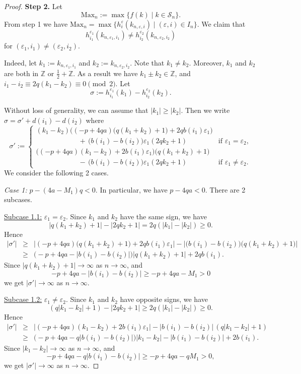 \documentclass[11pt]{amsart}
\numberwithin{equation}{section}
\theoremstyle{plain}
\theoremstyle{definition}
\def\BZ{\mathbb Z}
\def\CS{\mathcal S}
\def\ve{\varepsilon}
\begin{document}
\begin{proof}
\textbf{Step 2.} Let 
$$\text{Max}_n := \max \{f(k) \mid k \in \CS_n\}.$$
From step 1 we have $\text{Max}_n =  \max \{ h_{i}^{\ve}(k_{n, \ve, i}) \mid (\ve, i) \in I_n \}.$ We claim that $$h_{i_1}^{\ve_1}(k_{n,\ve_1,i_1}) \not= h_{i_2}^{\ve_2}(k_{n,\ve_2,i_2})$$
for $(\ve_1,i_1) \not= (\ve_2,i_2)$. 

Indeed, let $k_1:=k_{n,\ve_1,i_1}$ and $k_2:=k_{n,\ve_2,i_2}$. Note that $k_1 \not= k_2$. Moreover, $k_1$ and $k_2$ are both in  $\BZ$ or $\frac{1}{2} + \BZ$. As a result we have $k_1 \pm  k_2 \in \BZ$, and $i_1 - i_2 \equiv 2q (k_1 - k_2) \equiv 0 \pmod{2}$. Let
$$\sigma := h_{i_1}^{\ve_1}(k_1) - h_{i_2}^{\ve_2}(k_2).$$

Without loss of generality, we can assume that $|k_1| \ge |k_2|$. Then we write $\sigma = \sigma' + d(i_1) - d(i_2)$ where
$$
\sigma' := \begin{cases} (k_1 - k_2) \Big( (-p+4qa) \big( q(k_1+k_2)+1 \big) + 2qb(i_1)\ve_1 \Big) \\ \qquad \qquad \qquad + \, \big( b(i_1) - b(i_2) \big) \ve_1 (2qk_2 + 1) &\mbox{if } \ve_1 = \ve_2, \\
\Big( (-p+4qa)(k_1 - k_2) + 2b(i_1)\ve_1 \Big) \big( q(k_1+k_2)+1 \big) 
\\ \qquad \qquad \qquad - \, \big( b(i_1) - b(i_2) \big) \ve_1 (2qk_2 + 1) &\mbox{if } \ve_1 \not= \ve_2.  \end{cases}
$$
We consider the following 2 cases.

\smallskip

\textit{Case 1:} $p - (4a - M_1)q <0 $. In particular, we have $p - 4qa <0$. There are 2 subcases.

\underline{Subcase 1.1:} $\ve_1 = \ve_2$. Since $k_1$ and $k_2$ have the same sign, we have 
$$|q(k_1+k_2)+1| - |2qk_2+1| = 2q (|k_1| - |k_2|) \ge 0.$$
Hence
\begin{eqnarray*}
|\sigma'| &\ge& \big| (-p+4qa) \big( q(k_1+k_2)+1 \big) + 2qb(i_1)\ve_1 \big| - \big| \big( b(i_1) - b(i_2) \big) \big( q(k_1+k_2)+1 \big) \big| \\
&\ge& \big( -p + 4qa - |b(i_1) - b(i_2)| \big) |q(k_1+k_2)+1| + 2q b(i_1).
\end{eqnarray*}
Since $|q(k_1+k_2)+1| \to \infty$ as $n \to \infty$, and $$-p + 4qa - |b(i_1) - b(i_2)| \ge -p + 4qa - M_1 >0$$ 
we get $|\sigma'| \to \infty$ as $n \to \infty.$

\smallskip

\underline{Subcase 1.2:} $\ve_1 \not= \ve_2$. Since $k_1$ and $k_2$ have opposite signs, we have 
$$(q|k_1-k_2| + 1) - |2qk_2+1| \ge 2q (|k_1| - |k_2|)  \ge 0.$$
Hence
\begin{eqnarray*}
|\sigma'| &\ge& \big|  (-p+4qa)(k_1 - k_2) + 2b(i_1)\ve_1 \big| -  | b(i_1) - b(i_2)| \, ( q|k_1 - k_2| + 1) \\
&\ge& \big( -p + 4qa - q |b(i_1) - b(i_2)| \big) |k_1 - k_2| -  | b(i_1) - b(i_2)|  + 2 b(i_1).
\end{eqnarray*}
Since $|k_1 - k_2| \to \infty$ as $n \to \infty$, and $$-p + 4qa - q |b(i_1) - b(i_2)| \ge -p + 4q a  - q M_1 >0,$$ we get $|\sigma'| \to \infty$ as $n \to \infty.$


\end{proof}
\end{document}
